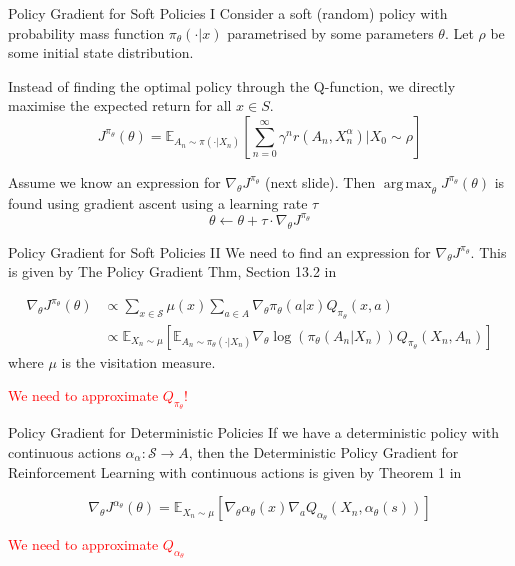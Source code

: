 \documentclass[usenames,handout,aspectratio=169]{beamer}
\newcommand{\red}[1]{\textcolor{red}{#1}}
\DeclareMathOperator*{\argmax}{arg\,max}
\begin{document}
\begin{frame}{Policy Gradient for Soft Policies I}
Consider a soft (random) policy with probability mass function $\pi_\theta(\cdot | x)$ parametrised by some parameters $\theta$. Let $\rho$ be some initial state distribution.  	
	
	Instead of finding the optimal policy through the Q-function, we directly maximise the expected return for all $x\in S$.
	\[
		J^{\pi_\theta}(\theta) = \mathbb E_{A_n\sim \pi(\cdot|X_n)} \left [ \sum_{n=0}^\infty \gamma^n r(A_n, X_n^\alpha) \bigg \vert X_0\sim \rho\right]
	\]
	
Assume we know an expression for $\nabla_\theta J^{\pi_\theta}$ (next slide). Then $\argmax_{\theta} J^{\pi_\theta}(\theta)$
is found using gradient ascent using a learning rate $\tau$
\[
\theta \leftarrow \theta + \tau \cdot \nabla_\theta J^{\pi_\theta}
\]
\end{frame}

\begin{frame}{Policy Gradient for Soft Policies II}
	 We need to find an expression for $\nabla_\theta J^{\pi_\theta}$. This is given by The Policy Gradient Thm, Section 13.2 in ~\cite{sutton2018reinforcement}
	\begin{Theorem}
		\[
		\begin{split}
		\nabla_\theta J^{\pi_\theta}(\theta) &  \propto \sum_{x\in\mathcal S} \mu(x) \sum_{a\in A} \nabla_\theta \pi_\theta(a|x) Q_{\pi_\theta}(x,a)  \\ 
		 & \propto \mathbb E_{X_n\sim \mu} \left[ \mathbb E_{A_n\sim \pi_\theta(\cdot|X_n)} \nabla_\theta \log (\pi_\theta(A_n | X_n)) Q_{\pi_\theta}(X_n,A_n)\right]
		\end{split}
		\]
		where $\mu$ is the visitation measure. 
	\end{Theorem}
	\red{We need to approximate $Q_{\pi_\theta}$!}
\end{frame}


\begin{frame}{Policy Gradient for Deterministic Policies}
If we have a deterministic policy with continuous actions $\alpha_\alpha: \mathcal S \rightarrow A$, then the
Deterministic Policy Gradient for Reinforcement Learning with continuous actions is given by Theorem 1 in ~\cite{silver2014deterministic}
\begin{Theorem}
\[
\nabla_\theta J^{\alpha_\theta}(\theta) = \mathbb E_{X_n\sim \mu} \left[ \nabla_\theta \alpha_\theta(x) \nabla_a Q_{\alpha_\theta}(X_n, \alpha_\theta(s)) \right]
\]	
\end{Theorem}
\red{We need to approximate $Q_{\alpha_\theta}$}
\end{frame}
\end{document}
